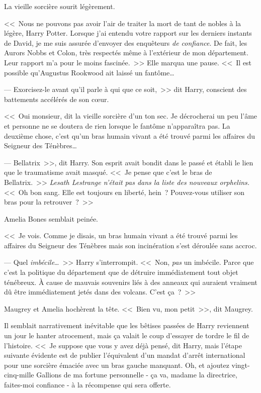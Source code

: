 La vieille sorcière sourit légèrement.

<<~Nous ne pouvons pas avoir l'air de traiter la mort de tant de nobles à la légère, Harry Potter. Lorsque j'ai entendu votre rapport sur les derniers instants de David, je me suis assurée d'envoyer des enquêteurs \emph{de confiance}. De fait, les Aurors Nobbs et Colon, très respectés même à l'extérieur de mon département. Leur rapport m'a pour le moins fascinée.~>> Elle marqua une pause. <<~Il est possible qu'Augustus Rookwood ait laissé un fantôme…

--- Exorcisez-le avant qu'il parle à qui que ce soit,~>> dit Harry, conscient des battements accélérés de son cœur.

<<~Oui monsieur, dit la vieille sorcière d'un ton sec. Je décrocherai un peu l'âme et personne ne se doutera de rien lorsque le fantôme n'apparaîtra pas. La deuxième chose, c'est qu'un bras humain vivant a été trouvé parmi les affaires du Seigneur des Ténèbres…

--- Bellatrix~>>, dit Harry. Son esprit avait bondit dans le passé et établi le lien que le traumatisme avait masqué. <<~Je pense que c'est le bras de Bellatrix.~>> \emph{Lesath Lestrange n'était pas dans la liste des nouveaux orphelins.} <<~Oh bon sang. Elle est toujours en liberté, hein~? Pouvez-vous utiliser son bras pour la retrouver~?~>>

Amelia Bones semblait peinée.

<<~Je vois. Comme je disais, un bras humain vivant a été trouvé parmi les affaires du Seigneur des Ténèbres mais son incinération s'est déroulée sans accroc.

--- Quel \emph{imbécile}…~>> Harry s'interrompit. <<~Non, \emph{pas} un imbécile. Parce que c'est la politique du département que de détruire immédiatement tout objet ténébreux. À cause de mauvais souvenirs liés à des anneaux qui auraient vraiment dû être immédiatement jetés dans des volcans. C'est ça~?~>>

Maugrey et Amelia hochèrent la tête. <<~Bien vu, mon petit~>>, dit Maugrey.

Il semblait narrativement inévitable que les bêtises passées de Harry reviennent un jour le hanter atrocement, mais ça valait le coup d'essayer de tordre le fil de l'histoire. <<~Je suppose que vous y avez déjà pensé, dit Harry, mais l'étape suivante évidente est de publier l'équivalent d'un mandat d'arrêt international pour une sorcière émaciée avec un bras gauche manquant. Oh, et ajoutez vingt-cinq-mille Gallions de ma fortune personnelle - ça va, madame la directrice, faites-moi confiance - à la récompense qui sera offerte.

